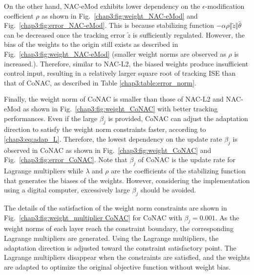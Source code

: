 On the other hand, NAC-eMod exhibits lower dependency on the $\epsilon$-modification coefficient $\rho$ as shown in Fig.~\ref{chap3:fig:weight_NAC-eMod} and Fig.~\ref{chap3:fig:error_NAC-eMod}.
This is because stabilizing function $-\alpha\rho\Vert\tilde z\Vert\hat\theta$ can be decreased once the tracking error $\tilde z$ is sufficiently regulated.
However, the bias of the weights to the origin still exists as described in Fig.~\ref{chap3:fig:weight_NAC-eMod} (\ie smaller weight norms are observed as $\rho$ is increased.).
Therefore, similar to NAC-L2, the biased weights produce insufficient control input, resulting in a relatively larger square root of tracking ISE than that of CoNAC, as described in Table \ref{chap3:table:error_norm}.

Finally, the weight norm of CoNAC is smaller than those of NAC-L2 and NAC-eMod as shown in Fig.~\ref{chap3:fig:weight_CoNAC} with better tracking performances.
Even if the large $\beta_j$ is provided, CoNAC can adjust the adaptation direction to satisfy the weight norm constraints faster, according to \eqref{chap3:eq:adap_L}.
Therefore, the lowest dependency on the update rate $\beta_j$ is observed in CoNAC as shown in Fig.~\ref{chap3:fig:weight_CoNAC} and Fig.~\ref{chap3:fig:error_CoNAC}.
Note that $\beta_j$ of CoNAC is the update rate for Lagrange multipliers while $\lambda$ and $\rho$ are the coefficients of the stabilizing function that generates the biases of the weights.
However, considering the implementation using a digital computer, excessively large $\beta_j$ should be avoided.

The details of the satisfaction of the weight norm constraints are shown in Fig.~\ref{chap3:fig:weight_multiplier CoNAC} for CoNAC with $\beta_j=0.001$.
As the weight norms of each layer reach the constraint boundary, the corresponding Lagrange multipliers are generated.
Using the Lagrange multipliers, the adaptation direction is adjusted toward the constraint satisfactory point.
The Lagrange multipliers disappear when the constraints are satisfied, and the weights are adapted to optimize the original objective function without weight bias.

